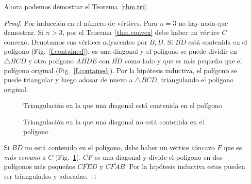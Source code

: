 \noindent{}Ahora podemos demostrar el Teorema~\ref{thm.tri}.

\begin{proof}
Por inducción en el número de vértices. Para $n=3$ no hay nada que demostrar. Si $n>3$, por el Teorema~\ref{thm.convex} debe haber un vértice $C$ convexo. Denotamos sus vértices adyacentes por $B,D$. Si $\overline{BD}$ está contenida en el polígono (Fig.~\ref{f.contained}), es una diagonal y el polígono se puede dividir en $\triangle BCD$ y otro polígono $\overline{ABDE}$ con $\overline{BD}$ como lado y que es más pequeño que el polígono original (Fig.~\ref{f.contained}). Por la hipótesis inductiva, el polígono se puede triangular y luego adosar de nuevo a $\triangle BCD$, triangulando el polígono original.

\begin{figure}[t]
\begin{minipage}{.45\textwidth}
\begin{center}
\caption{Triangulación en la que una diagonal está contenida en el polígono}\label{f.contained}
\end{center}
\end{minipage}
\hfill
\begin{minipage}{.45\textwidth}
\begin{center}
\caption{Triangulación en la que una diagonal no está contenida en el polígono}\label{f.museum.concave-vertices}
\end{center}
\end{minipage}
\end{figure}

Si $\overline{BD}$ no está contenido en el polígono, debe haber un vértice cóncavo $F$ que es \emph{más cercano} a $C$ (Fig.~\ref{f.museum.concave-vertices}). $\overline{CF}$ es una diagonal y divide el polígono en dos polígonos más pequeños $\overline{CFED}$ y $\overline{CFAB}$. Por la hipótesis inductiva estos pueden ser triangulados y adosadas.
\end{proof}

